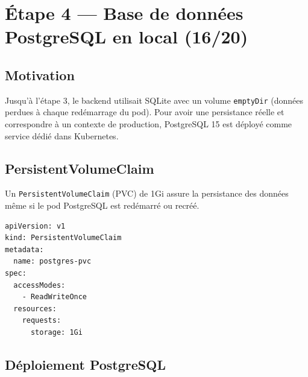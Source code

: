 \documentclass[12pt,a4paper]{article}
\begin{document}
\section{Étape 4 — Base de données PostgreSQL en local (16/20)}

\subsection{Motivation}

Jusqu'à l'étape 3, le backend utilisait SQLite avec un volume \texttt{emptyDir} (données
perdues à chaque redémarrage du pod). Pour avoir une persistance réelle et correspondre
à un contexte de production, PostgreSQL 15 est déployé comme service dédié dans Kubernetes.

\subsection{PersistentVolumeClaim}

Un \texttt{PersistentVolumeClaim} (PVC) de 1Gi assure la persistance des données même si
le pod PostgreSQL est redémarré ou recréé.

\begin{lstlisting}[style=yaml, caption={k8s/postgres-deployment.yaml — PVC}]
apiVersion: v1
kind: PersistentVolumeClaim
metadata:
  name: postgres-pvc
spec:
  accessModes:
    - ReadWriteOnce
  resources:
    requests:
      storage: 1Gi
\end{lstlisting}

\subsection{Déploiement PostgreSQL}
\end{document}
